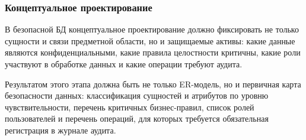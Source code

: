 \subsubsection{Концептуальное проектирование}

В безопасной БД концептуальное проектирование должно фиксировать не только сущности и связи предметной области,
но и защищаемые активы: какие данные являются конфиденциальными, какие правила целостности критичны, какие роли
участвуют в обработке данных и какие операции требуют аудита.

Результатом этого этапа должна быть не только ER-модель, но и первичная карта безопасности данных: классификация
сущностей и атрибутов по уровню чувствительности, перечень критичных бизнес-правил, список ролей пользователей
и перечень операций, для которых требуется обязательная регистрация в журнале аудита.

